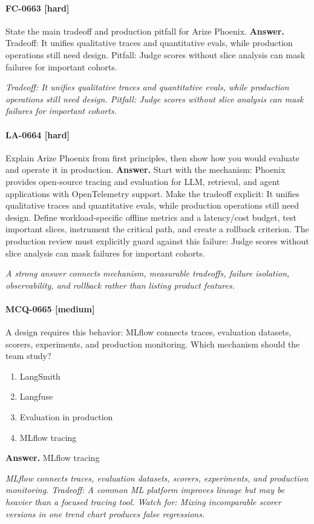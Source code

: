 \paragraph{FC-0663 [hard]} State the main tradeoff and production pitfall for Arize Phoenix.
\noindent\textbf{Answer.} Tradeoff: It unifies qualitative traces and quantitative evals, while production operations still need design. Pitfall: Judge scores without slice analysis can mask failures for important cohorts.
\par\textit{Tradeoff: It unifies qualitative traces and quantitative evals, while production operations still need design. Pitfall: Judge scores without slice analysis can mask failures for important cohorts.}
\paragraph{LA-0664 [hard]} Explain Arize Phoenix from first principles, then show how you would evaluate and operate it in production.
\noindent\textbf{Answer.} Start with the mechanism: Phoenix provides open-source tracing and evaluation for LLM, retrieval, and agent applications with OpenTelemetry support. Make the tradeoff explicit: It unifies qualitative traces and quantitative evals, while production operations still need design. Define workload-specific offline metrics and a latency/cost budget, test important slices, instrument the critical path, and create a rollback criterion. The production review must explicitly guard against this failure: Judge scores without slice analysis can mask failures for important cohorts.
\par\textit{A strong answer connects mechanism, measurable tradeoffs, failure isolation, observability, and rollback rather than listing product features.}
\paragraph{MCQ-0665 [medium]} A design requires this behavior: MLflow connects traces, evaluation datasets, scorers, experiments, and production monitoring. Which mechanism should the team study?
\begin{enumerate}[label=\Alph*.]
\item LangSmith
\item Langfuse
\item Evaluation in production
\item MLflow tracing
\end{enumerate}
\noindent\textbf{Answer.} MLflow tracing
\par\textit{MLflow connects traces, evaluation datasets, scorers, experiments, and production monitoring. Tradeoff: A common ML platform improves lineage but may be heavier than a focused tracing tool. Watch for: Mixing incomparable scorer versions in one trend chart produces false regressions.}
